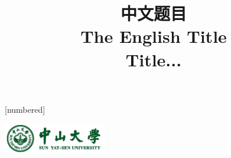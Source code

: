 \documentclass[UTF8, xcolor=table]{beamer}
\begin{document}
	[numbered]
	\renewcommand*{\bibfont}{\footnotesize}
	
	\title[融合长短记忆神经网络与卷积特征学习的图像语义分割]{中文题目 \\ \vskip 8pt \normalsize The English Title \\ Title...}
	\author[~~~~陈胜杰~~~~CHEN Shengjie]{}
	\date{}
	
	{
		
		
		\begin{frame}
			
			\begin{flushright}
				\vspace{-13.888mm}
				\includegraphics[width=4.5cm]{styles/logo.png}
			\end{flushright}
		

\end{frame}}
\end{document}
